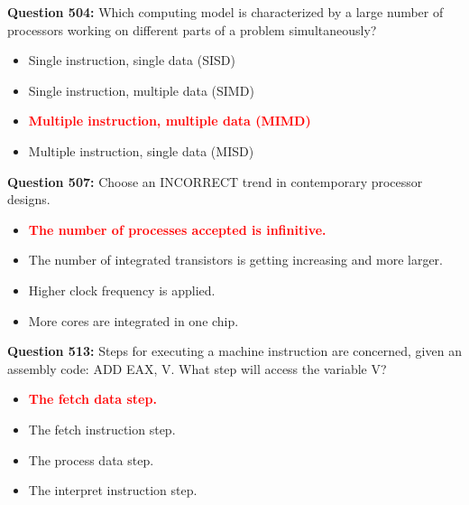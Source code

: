 \documentclass[12pt,a4paper]{article}
\begin{document}
\vspace{0.5cm}

\textbf{Question 504:} Which computing model is characterized by a large number of processors working on different parts of a problem simultaneously?

\begin{itemize}
    \item[\textbf{A.}] Single instruction, single data (SISD)
    \item[\textbf{B.}] Single instruction, multiple data (SIMD)
    \item[\textbf{C.}] \textcolor{red}{\textbf{Multiple instruction, multiple data (MIMD)}}
    \item[\textbf{D.}] Multiple instruction, single data (MISD)
\end{itemize}

\vspace{0.5cm}

\textbf{Question 507:} Choose an INCORRECT trend in contemporary processor designs.

\begin{itemize}
    \item[\textbf{A.}] \textcolor{red}{\textbf{The number of processes accepted is infinitive.}}
    \item[\textbf{B.}] The number of integrated transistors is getting increasing and more larger.
    \item[\textbf{C.}] Higher clock frequency is applied.
    \item[\textbf{D.}] More cores are integrated in one chip.
\end{itemize}

\vspace{0.5cm}

\textbf{Question 513:} Steps for executing a machine instruction are concerned, given an assembly code: ADD EAX, V. What step will access the variable V?

\begin{itemize}
    \item[\textbf{A.}] \textcolor{red}{\textbf{The fetch data step.}}
    \item[\textbf{B.}] The fetch instruction step.
    \item[\textbf{C.}] The process data step.
    \item[\textbf{D.}] The interpret instruction step.
\end{itemize}

\vspace{0.5cm}
\end{document}

